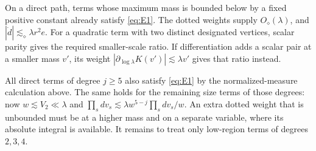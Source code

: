 On a direct path, terms whose maximum mass is bounded below by a
fixed positive constant already satisfy \eqref{eq:E1}. The dotted
weights supply \(O_\diamond(\lambda)\), and
\(|\dot d|\lesssim_\diamond\lambda r^2e\). For a quadratic term with
two distinct designated vertices, scalar parity gives the required
smaller-scale ratio. If differentiation adds a scalar pair at a
smaller mass \(v'\), its weight
\(|\partial_{\log\lambda}K(v')|\lesssim\lambda v'\) gives that ratio
instead.

All direct terms of degree \(j\ge5\) also satisfy \eqref{eq:E1} by
the normalized-measure calculation above. The same holds for the
remaining size terms of those degrees: now \(w\lesssim V_2\ll\lambda\)
and
\(\prod_s dv_s\lesssim\lambda w^{5-j}\prod_s dv_s/w\).
An extra dotted weight that is unbounded must be at a higher mass and
on a separate variable, where its absolute integral is available.
It remains to treat only low-region terms of degrees \(2,3,4\).

